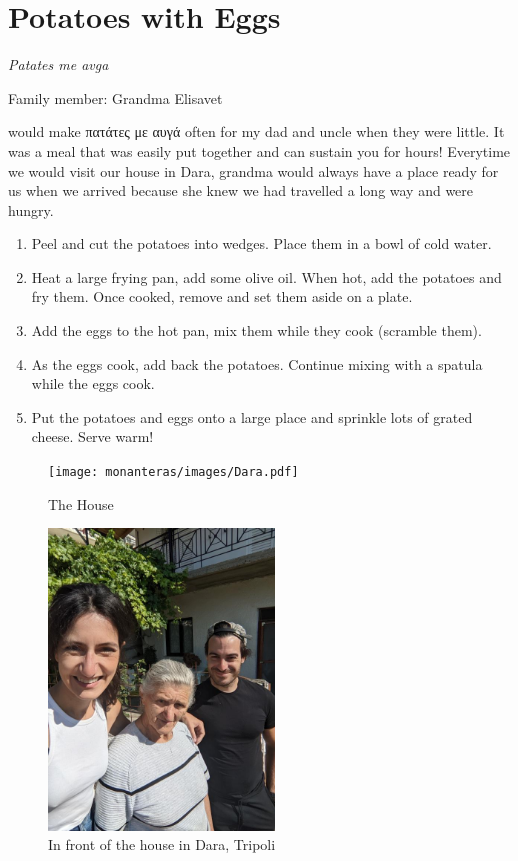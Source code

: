 \chapter{Potatoes with Eggs}
\label{ch:eggswithpotatoes}


\textit{Patates me avga}

Family member: Grandma Elisavet

 would make \textgreek{πατάτες με αυγά} often for my dad and uncle when they were little. It was a meal that was easily put together and can sustain you for hours! Everytime we would visit our house in Dara, grandma would always have a place ready for us when we arrived because she knew we had travelled a long way and were hungry.

\begin{enumerate}
    \item Peel and cut the potatoes into wedges. Place them in a bowl of cold water.
    \item Heat a large frying pan, add some olive oil. When hot, add the potatoes and fry them. Once cooked, remove and set them aside on a plate.
    \item Add the eggs to the hot pan, mix them while they cook (scramble them). 
    \item As the eggs cook, add back the potatoes. Continue mixing with a spatula while the eggs cook.
    \item Put the potatoes and eggs onto a large place and sprinkle lots of grated cheese. Serve warm!
\end{enumerate}

\begin{figure}
  \texttt{[image: monanteras/images/Dara.pdf]}
  \caption{The House}
\end{figure}
\begin{figure}
  \includegraphics[width=60mm]{monanteras/images/Grandma elisavet.jpg}
  \caption{In front of the house in Dara, Tripoli}
\end{figure}
